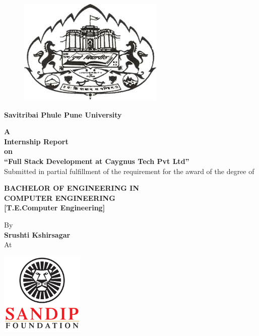
\begin{titlepage}
	\begin{figure}
		\centering
		\includegraphics[width=0.3\linewidth]{./unilogo11}
	\end{figure}
	
	
	\begin{center}
		\textbf{\large Savitribai Phule Pune University}
	\end{center}



\begin{center}
{\Large\bf A}\\
\vspace{0.05in} 
{\Large \bf Internship Report}\\
\vspace{0.05in}
{\Large\bf on}\\
\vspace{0.1in}
{\Large \bf \color{red}``Full Stack Development at Caygnus Tech Pvt Ltd''}\\
\vspace{0.15in}
{\small Submitted in partial fulfillment of the requirement for the award of the degree of}\\
\vspace{0.1in}

{\large   \textbf{BACHELOR OF ENGINEERING IN}}\\ 
{\large  \textbf{COMPUTER ENGINEERING}}\\
\textbf{[T.E.Computer Engineering]}\\

\vspace{0.1in}

{By}\\
\vspace{0.1in}
{\textbf {Srushti Kshirsagar}}  \\



{\text At}\\

\vspace{0.1in}

\centering \includegraphics [width=4cm ]{NLOGO}


\end{center}
\end{titlepage}
